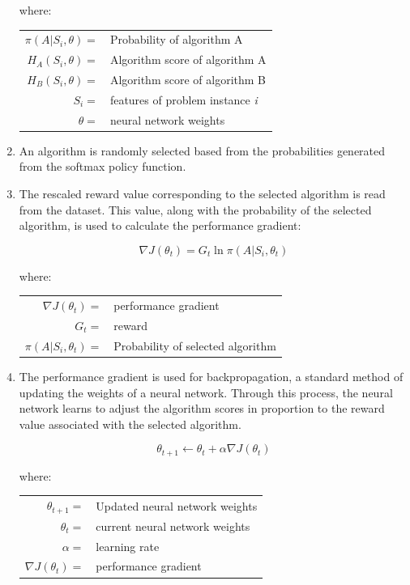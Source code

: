\begin{enumerate}
	where:
	
	\begin{table}[H]
		\centering
		\begin{tabular}{rl}
			$\pi(A | S_i, \theta) =$ & Probability of algorithm A \\
			$H_A(S_i, \theta) =$ & Algorithm score of algorithm A \\
			$H_B(S_i, \theta) =$ & Algorithm score of algorithm B \\
			$S_i =$ & features of problem instance \textit{i} \\
			$\theta =$ & neural network weights
		\end{tabular}
	\end{table}

	\item An algorithm is randomly selected based from the probabilities generated from the softmax policy function.
	
	\item The rescaled reward value corresponding to the selected algorithm is read from the dataset. This value, along with the probability of the selected algorithm, is used to calculate the performance gradient:
	
	\begin{equation}
	\nabla J(\theta_t) = G_t\ln{\pi(A | S_i, \theta_t)}
	\end{equation}
	
	where:
	
	\begin{table}[H]
		\centering
		\begin{tabular}{rl}
			$\nabla J(\theta_t) =$ & performance gradient \\
			$G_t =$ & reward \\
			$\pi(A | S_i, \theta_t) =$ & Probability of selected algorithm
		\end{tabular}
	\end{table}

	\item The performance gradient is used for backpropagation, a standard method of updating the weights of a neural network. Through this process, the neural network learns to adjust the algorithm scores in proportion to the reward value associated with the selected algorithm. 
	
	\begin{equation}
	\theta_{t+1} \gets \theta_t + \alpha \nabla J(\theta_t)
	\end{equation}
	
	where:
	
	\begin{table}[H]
		\centering
		\begin{tabular}{rl}
			$\theta_{t+1} =$ & Updated neural network weights \\
			$\theta_t =$ & current neural network weights \\
			$\alpha =$ & learning rate \\
			$\nabla J(\theta_t) =$ & performance gradient
		\end{tabular}
	\end{table}
\end{enumerate}

